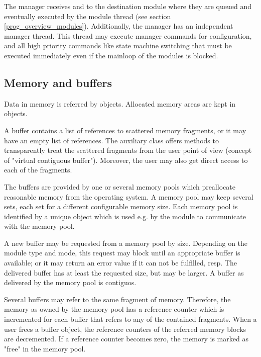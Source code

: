 The manager receives and  
to the destination module where they are queued and eventually executed 
by the module thread (see section \ref{prog_overview_modules}).
Additionally, the manager has an independent manager thread. 
This thread may execute manager commands for configuration, 
and all high priority commands like state machine switching 
that must be executed immediately even if the mainloop of the modules is blocked.
 
 
\subsection{Memory and buffers}
Data in memory is referred by   objects. 
Allocated memory areas are kept in 
objects. 
   

A buffer contains a list of references to scattered memory 
fragments, or it may have an empty list of references. 
The auxiliary class   
offers methods to transparently 
treat the scattered fragments from the user point of view 
(concept of "virtual contiguous buffer"). 
Moreover, the user may also get direct access to each of the fragments.      

The buffers are provided by one or several memory pools 
which preallocate reasonable memory from the operating system. 
A memory pool may keep several sets, each set for a different 
configurable memory size. Each memory pool is identified by a 
unique   
object which is used e.g. by the module to 
communicate with the memory pool.  

A new buffer may be requested from a memory pool by size. 
Depending on the module type and mode, this request may block until an 
appropriate buffer is available; or it may return an error value 
if it can not be fulfilled, resp. The delivered buffer has at 
least the requested size, but may be larger. A buffer as 
delivered by the memory pool is contiguos. 

Several buffers may refer to the same fragment of memory. 
Therefore, the memory as owned by the memory pool has a 
reference counter which is incremented for each buffer 
that refers to any of the contained fragments. When a user frees 
a buffer object, the reference counters of the referred 
memory blocks are decremented. If a reference counter becomes 
zero, the memory is marked as "free" in the memory pool.


